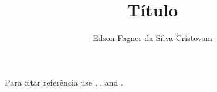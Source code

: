\documentclass[12pt]{article}
\title{Título}
\author{Edson Fagner da Silva Cristovam \inst{1} }
\begin{document}
 

\maketitle










Para citar referência use \cite{knuth:84}, \cite{boulic:91},  and \cite{smith:99}.



\end{document}
